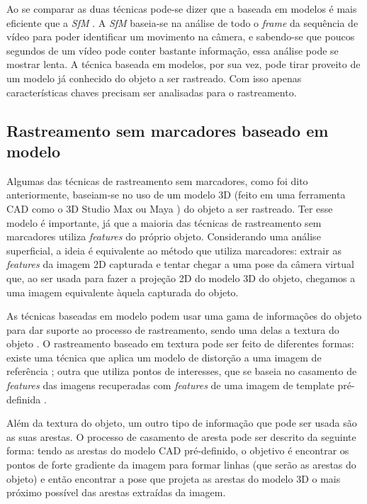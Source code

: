 Ao se comparar as duas técnicas pode-se dizer que a baseada em modelos é mais eficiente que a \emph{SfM} \cite{drummondecipolla}. A \emph{SfM} baseia-se na análise de todo o \emph{frame} da sequência de vídeo para poder identificar um movimento na câmera, e sabendo-se que poucos segundos de um vídeo pode conter bastante informação, essa análise pode se mostrar lenta. A técnica baseada em modelos, por sua vez, pode tirar proveito de um modelo já conhecido do objeto a ser rastreado. Com isso apenas características chaves precisam ser analisadas para o rastreamento.

\subsection{Rastreamento sem marcadores baseado em modelo}

Algumas das técnicas de rastreamento sem marcadores, como foi dito anteriormente, baseiam-se no uso de um modelo 3D (feito em uma ferramenta CAD como o 3D Studio Max \cite{ref_3dsmax} ou Maya \cite{ref_maya}) do objeto a ser rastreado. Ter esse modelo é importante, já que a maioria das técnicas de rastreamento sem marcadores utiliza \emph{features} do próprio objeto. Considerando uma análise superficial, a ideia é equivalente ao método que utiliza marcadores: extrair as \emph{features} da imagem 2D capturada e tentar chegar a uma pose da câmera virtual que, ao ser usada para fazer a projeção 2D do modelo 3D do objeto, chegamos a uma imagem equivalente àquela capturada do objeto.

As técnicas baseadas em modelo podem usar uma gama de informações do objeto para dar suporte ao processo de rastreamento, sendo uma delas a textura do objeto \cite{teichrieb2007survey}. O rastreamento baseado em textura pode ser feito de diferentes formas: existe uma técnica que aplica um modelo de distorção a uma imagem de referência \cite{ref_19tgchico}; outra que utiliza pontos de interesses, que se baseia no casamento de \emph{features} das imagens recuperadas com \emph{features} de uma imagem de template pré-definida \cite{lepetit}.

Além da textura do objeto, um outro tipo de informação que pode ser usada são as suas arestas. O processo de casamento de aresta pode ser descrito da seguinte forma: tendo as arestas do modelo CAD pré-definido, o objetivo é encontrar os pontos de forte gradiente da imagem para formar linhas (que serão as arestas do objeto) e então encontrar a pose que projeta as arestas do modelo 3D o mais próximo possível das arestas extraídas da imagem.


